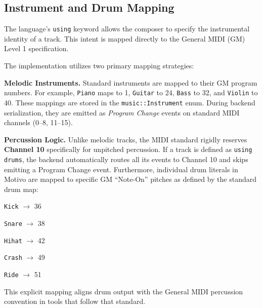 \subsection{Instrument and Drum Mapping}\label{detail-subsec:instrument-and-drum-mapping}

The language's \texttt{using} keyword allows the composer to specify the instrumental identity of a track.
This intent is mapped directly to the General MIDI (GM) Level 1 specification.

The implementation utilizes two primary mapping strategies:

\noindent \textbf{Melodic Instruments.} Standard instruments are mapped to their GM program numbers.
For example, \texttt{Piano} maps to 1, \texttt{Guitar} to 24, \texttt{Bass} to 32, and \texttt{Violin} to 40.
These mappings are stored in the \texttt{music::Instrument} enum.
During backend serialization, they are emitted as \textit{Program Change} events on standard MIDI channels (0--8,
11--15).

\noindent \textbf{Percussion Logic.} Unlike melodic tracks, the MIDI standard rigidly reserves \textbf{Channel 10}
specifically for unpitched percussion.
If a track is defined as \texttt{using drums}, the backend automatically routes all its events to Channel 10 and
skips emitting a Program Change event.
Furthermore, individual drum literals in Motivo are mapped to specific GM ``Note-On'' pitches as defined by the
standard drum map:

\noindent \texttt{Kick} $\rightarrow$ 36

\noindent \texttt{Snare} $\rightarrow$ 38

\noindent \texttt{Hihat} $\rightarrow$ 42

\noindent \texttt{Crash} $\rightarrow$ 49

\noindent \texttt{Ride} $\rightarrow$ 51

This explicit mapping aligns drum output with the General MIDI percussion convention in tools that follow that standard.

